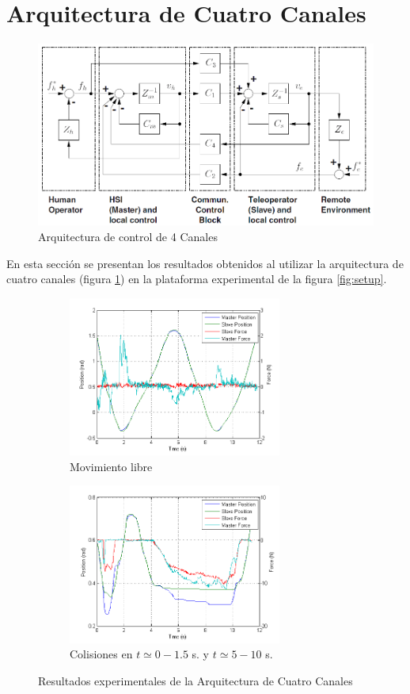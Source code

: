 \section{Arquitectura de Cuatro Canales}
\label{sec:4canales}
\begin{figure}[htbp]
\centering
	\includegraphics[width=\textwidth]{four}
	\caption{Arquitectura de control de 4 Canales} %
  	\label{fig:four} %
\end{figure}
En esta sección se presentan los resultados obtenidos al utilizar la arquitectura de cuatro canales (figura \ref{fig:four}) en la plataforma experimental de la figura \ref{fig:setup}.
\begin{figure}[htbp]
\centering
	\begin{subfigure}[h]
		\centering
		\includegraphics[height=5.25cm]{four-exp-libre}
		\caption{Movimiento  libre}
		\label{fig:four-exp-libre}
	\end{subfigure}
	\begin{subfigure}[h]
		\centering
		\includegraphics[height=5.25cm]{four-exp-env}
		\caption{Colisiones en $t\simeq 0-1.5$ s. y $t\simeq 5-10$ s.}
		\label{fig:four-exp-env}
	\end{subfigure}		
	\caption{Resultados experimentales de la Arquitectura de Cuatro Canales}
  	\label{fig:four-exp}
\end{figure}

